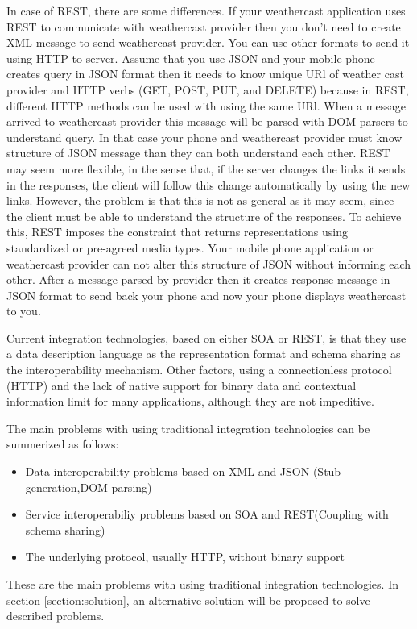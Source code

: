 In case of REST, there are some differences. If your weathercast application uses REST to communicate with weathercast provider then you don’t need to create XML message to send weathercast provider. You can use other formats to send it using HTTP to server. Assume that you use JSON and your mobile phone creates query in JSON format then it needs to know unique URl of weather cast provider and HTTP verbs (GET, POST, PUT, and DELETE) because in REST, different HTTP methods can be used with using the same URl. When a message arrived to weathercast provider this message will be parsed with DOM parsers to understand query. In that case your phone and weathercast provider must know structure of JSON message than they can both understand each other. REST may seem more flexible, in the sense that, if the server changes the links it sends in the responses, the client will follow this change automatically by using the new links. However, the problem is that this is not as general as it may seem, since the client must be able to understand the structure of the responses. To achieve this, REST imposes the constraint that returns representations using standardized or pre-agreed media types. Your mobile phone application or weathercast provider can not alter this structure of JSON without informing each other. After a message parsed by provider then it creates response message in JSON format to send back your phone and now your phone displays weathercast to you.

Current integration technologies, based on either SOA or REST, is that they use a data description language as the representation format and schema sharing as the interoperability mechanism. Other factors, using a connectionless protocol (HTTP) and the lack of native support for binary data and contextual information limit for many applications, although they are not impeditive.

The main problems with using traditional integration technologies can be summerized as follows:
\begin{itemize}
  \item Data interoperability problems based on XML and JSON (Stub generation,DOM parsing)
  \item Service interoperabiliy problems based on SOA and REST(Coupling with schema sharing)
  \item The underlying protocol, usually HTTP, without binary support
\end{itemize}

These are the main problems with using traditional integration technologies. In section \ref{section:solution}, an alternative solution will be proposed to solve described problems.

